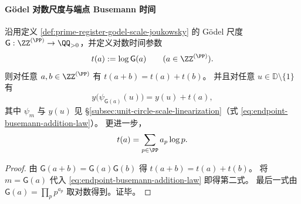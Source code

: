 \paragraph{Gödel 对数尺度与端点 Busemann 时间}
\begin{proposition}\label{prop:prime-register-godel-log-busemann-time}
沿用定义 \ref{def:prime-register-godel-scale-joukowsky} 的 Gödel 尺度 \(\mathsf{G}:\ZZ^{(\PP)}\to\QQ_{>0}\)，并定义对数时间参数
\[
t(a):=\log \mathsf{G}(a)\qquad(a\in\ZZ^{(\PP)}).
\]
则对任意 \(a,b\in\ZZ^{(\PP)}\) 有 \(t(a+b)=t(a)+t(b)\)。
并且对任意 \(u\in\mathbb{D}\setminus\{1\}\) 有
\[
y\!\bigl(\psi_{\mathsf{G}(a)}(u)\bigr)=y(u)+t(a),
\]
其中 \(\psi_m\) 与 \(y(u)\) 见 \S\ref{subsec:unit-circle-scale-linearization}（式 \eqref{eq:endpoint-busemann-addition-law}）。
更进一步，
\[
t(a)=\sum_{p\in\PP}a_p\log p.
\]
\end{proposition}
\begin{proof}
由 \(\mathsf{G}(a+b)=\mathsf{G}(a)\mathsf{G}(b)\) 得 \(t(a+b)=t(a)+t(b)\)。
将 \(m=\mathsf{G}(a)\) 代入 \eqref{eq:endpoint-busemann-addition-law} 即得第二式。
最后一式由 \(\mathsf{G}(a)=\prod_{p}p^{a_p}\) 取对数得到。证毕。
\end{proof}

\endinput

